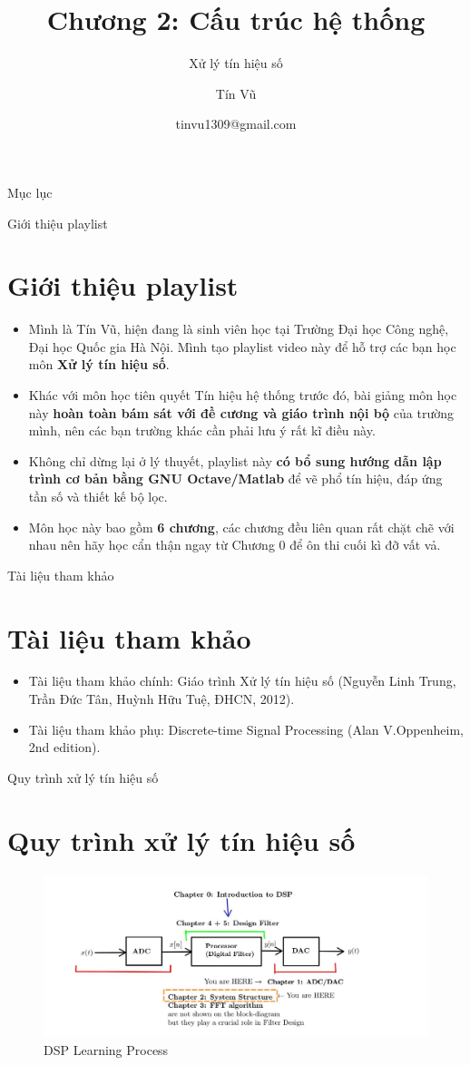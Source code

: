 \documentclass[8pt]{beamer}
\title[Chương 2: Cấu trúc hệ thống] %
{Chương 2: Cấu trúc hệ thống}
\subtitle{Xử lý tín hiệu số}
\author[Xử lý tín hiệu số] %
{Tín Vũ}
\date[VLC 2021] %
{tinvu1309@gmail.com}
\begin{document}
\frame{\titlepage}
\begin{frame}{Mục lục}
\tableofcontents
\end{frame}
\begin{frame}{Giới thiệu playlist}
\section{Giới thiệu playlist}
	\begin{itemize}
		\item Mình là Tín Vũ, hiện đang là sinh viên học tại Trường Đại học Công nghệ, Đại học Quốc gia Hà Nội. Mình tạo playlist video này để hỗ trợ các bạn học môn \textbf{Xử lý tín hiệu số}.
\item Khác với môn học tiên quyết \alert{Tín hiệu hệ thống} trước đó, bài giảng môn học này \textbf{hoàn toàn bám sát với đề cương và giáo trình nội bộ} của trường mình, nên các bạn trường khác cần phải lưu ý rất kĩ điều này.
\item Không chỉ dừng lại ở lý thuyết, playlist này \textbf{có bổ sung hướng dẫn lập trình cơ bản bằng GNU Octave/Matlab} để vẽ phổ tín hiệu, đáp ứng tần số và thiết kế bộ lọc.
\item Môn học này bao gồm \textbf{6 chương}, các chương đều liên quan rất chặt chẽ với nhau nên hãy học cẩn thận ngay từ \alert{Chương 0} để ôn thi cuối kì đỡ vất vả.
	\end{itemize}
\end{frame}
\begin{frame}{Tài liệu tham khảo}
\section{Tài liệu tham khảo}
\begin{itemize}
		\item Tài liệu tham khảo chính: Giáo trình Xử lý tín hiệu số (Nguyễn Linh Trung, Trần Đức Tân, Huỳnh Hữu Tuệ, ĐHCN, 2012).
		\item Tài liệu tham khảo phụ: Discrete-time Signal Processing (Alan V.Oppenheim, 2nd edition). 
	\end{itemize}
\end{frame}
\begin{frame}{Quy trình xử lý tín hiệu số}
\section{Quy trình xử lý tín hiệu số}
\begin{figure}[h]
			\includegraphics[width=1.1\textwidth]{1.jpg}
			\caption{DSP Learning Process}			\label{fig:re1}
		\end{figure}

\end{frame}
\end{document}
